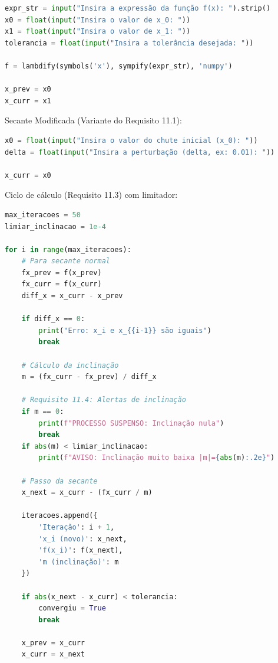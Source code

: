 \documentclass[
	12pt,				%
	openright,			%
	oneside,			%
	a4paper,			%
	english,			%
	brazil				%
	]{abntex2}
\begin{document}
\begin{lstlisting}[language=Python, caption={Requisito 11.1 - Secante Normal}]
expr_str = input("Insira a expressão da função f(x): ").strip()
x0 = float(input("Insira o valor de x_0: "))
x1 = float(input("Insira o valor de x_1: "))
tolerancia = float(input("Insira a tolerância desejada: "))

f = lambdify(symbols('x'), sympify(expr_str), 'numpy')

x_prev = x0
x_curr = x1
\end{lstlisting}

Secante Modificada (Variante do Requisito 11.1):

\begin{lstlisting}[language=Python, caption={Requisito 11.1 - Secante Modificada}]
x0 = float(input("Insira o valor do chute inicial (x_0): "))
delta = float(input("Insira a perturbação (delta, ex: 0.01): "))

x_curr = x0
\end{lstlisting}

Ciclo de cálculo (Requisito 11.3) com limitador:

\begin{lstlisting}[language=Python, caption={Requisito 11.3 - Ciclo com Limitador}]
max_iteracoes = 50
limiar_inclinacao = 1e-4

for i in range(max_iteracoes):
    # Para secante normal
    fx_prev = f(x_prev)
    fx_curr = f(x_curr)
    diff_x = x_curr - x_prev
    
    if diff_x == 0:
        print("Erro: x_i e x_{{i-1}} são iguais")
        break
    
    # Cálculo da inclinação
    m = (fx_curr - fx_prev) / diff_x
    
    # Requisito 11.4: Alertas de inclinação
    if m == 0:
        print(f"PROCESSO SUSPENSO: Inclinação nula")
        break
    if abs(m) < limiar_inclinacao:
        print(f"AVISO: Inclinação muito baixa |m|={abs(m):.2e}")
    
    # Passo da secante
    x_next = x_curr - (fx_curr / m)
    
    iteracoes.append({
        'Iteração': i + 1,
        'x_i (novo)': x_next,
        'f(x_i)': f(x_next),
        'm (inclinação)': m
    })
    
    if abs(x_next - x_curr) < tolerancia:
        convergiu = True
        break
    
    x_prev = x_curr
    x_curr = x_next
\end{lstlisting}
\end{document}
